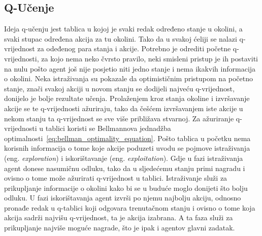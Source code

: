 \subsection{Q-Učenje}
Ideja q-učenju jest tablica u kojoj je svaki redak određeno stanje u okolini, a svaki stupac određena akcija za tu okolini. Tako da u svakoj ćeliji se nalazi q-vrijednost za odeđenog para stanja i akcije. Potrebno je odrediti početne q-vrijednosti, za kojo nema neko čvrsto pravilo, neki smisleni pristup je ih postaviti na nulu pošto agent još nije posjetio niti jedno stanje i nema ikakvih informacija o okolini. Neka istraživanja su pokazale da optimističnim pristupom na početno stanje, znači svakoj akciji u novom stanju se dodijeli najveću q-vrijednost, donijelo je bolje rezultate učenja. Prolaženjem kroz stanja okoline i izvršavanje akcije se te q-vrijednosti ažuriraju, tako da češćem izvršavanjem iste akcije u nekom stanju ta q-vrijednost se sve više približava stvarnoj. Za ažuriranje q-vrijednosti u tablici koristi se Bellmannova jednadžba optimalnosti~\ref{eq:bellman_optimality_equation}. Pošto tablica u početku nema korisnih informacija o tome koje akcije poduzeti uvodu se pojmove istraživanja (eng. \textit{exploration}) i iskorištavanje (eng. \textit{exploitation}). Gdje u fazi istraživanja agent donese nasumičnu odluku, tako da u sljedećemu stanju primi nagradu i ovisno o tome može ažurirati q-vrijednost u tablici. Istraživanje služi za prikupljanje informacije o okolini kako bi se u buduće moglo donijeti što bolju odluku. U fazi iskorištavanja agent izvrši po njemu najbolju akciju, odnosno pronađe redak u q-tablici koji odgovara trenutačnom stanju i ovisno o tome koja akcija sadrži najvišu q-vrijednost, ta je akcija izabrana. A ta faza služi za prikupljanje najviše moguće nagrade, što je ipak i agentov glavni zadatak. 

